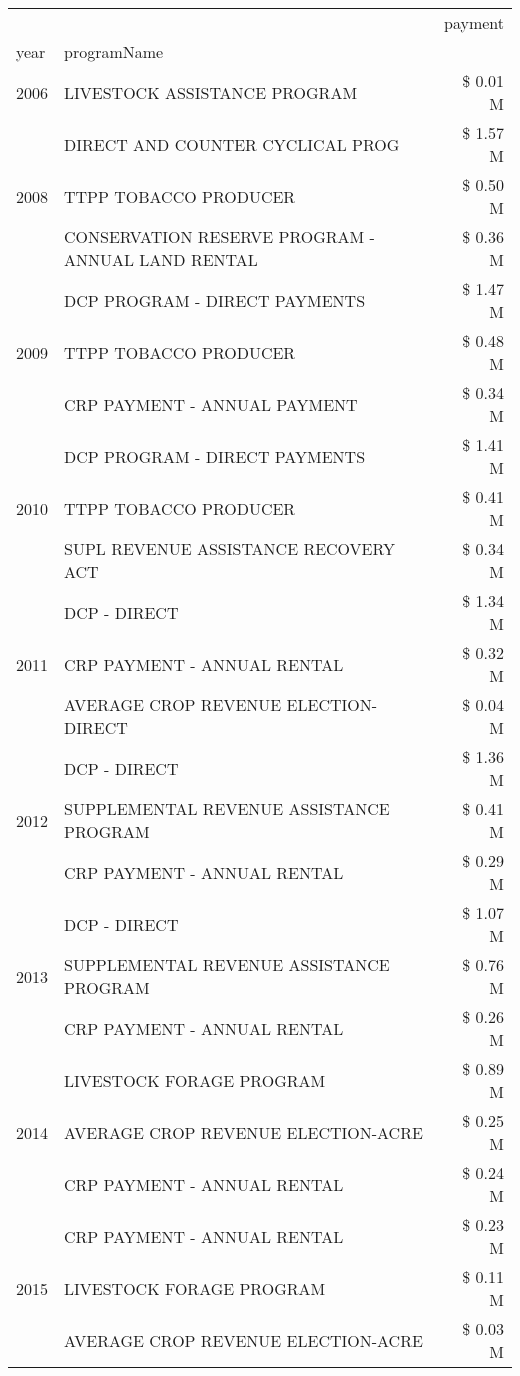 \begin{tabular}{llr}
\toprule
 &  & payment \\
year & programName &  \\
\midrule
2006 & LIVESTOCK ASSISTANCE PROGRAM & \$ 0.01 M \\
\cline{1-3}
\multirow[t]{3}{*}{2008} & DIRECT AND COUNTER CYCLICAL PROG & \$ 1.57 M \\
 & TTPP TOBACCO PRODUCER & \$ 0.50 M \\
 & CONSERVATION RESERVE PROGRAM - ANNUAL LAND RENTAL & \$ 0.36 M \\
\cline{1-3}
\multirow[t]{3}{*}{2009} & DCP PROGRAM - DIRECT PAYMENTS & \$ 1.47 M \\
 & TTPP TOBACCO PRODUCER & \$ 0.48 M \\
 & CRP PAYMENT - ANNUAL PAYMENT & \$ 0.34 M \\
\cline{1-3}
\multirow[t]{3}{*}{2010} & DCP PROGRAM - DIRECT PAYMENTS & \$ 1.41 M \\
 & TTPP TOBACCO PRODUCER & \$ 0.41 M \\
 & SUPL REVENUE ASSISTANCE RECOVERY ACT & \$ 0.34 M \\
\cline{1-3}
\multirow[t]{3}{*}{2011} & DCP - DIRECT & \$ 1.34 M \\
 & CRP PAYMENT - ANNUAL RENTAL & \$ 0.32 M \\
 & AVERAGE CROP REVENUE ELECTION-DIRECT & \$ 0.04 M \\
\cline{1-3}
\multirow[t]{3}{*}{2012} & DCP - DIRECT & \$ 1.36 M \\
 & SUPPLEMENTAL REVENUE ASSISTANCE PROGRAM & \$ 0.41 M \\
 & CRP PAYMENT - ANNUAL RENTAL & \$ 0.29 M \\
\cline{1-3}
\multirow[t]{3}{*}{2013} & DCP - DIRECT & \$ 1.07 M \\
 & SUPPLEMENTAL REVENUE ASSISTANCE PROGRAM & \$ 0.76 M \\
 & CRP PAYMENT - ANNUAL RENTAL & \$ 0.26 M \\
\cline{1-3}
\multirow[t]{3}{*}{2014} & LIVESTOCK FORAGE PROGRAM & \$ 0.89 M \\
 & AVERAGE CROP REVENUE ELECTION-ACRE & \$ 0.25 M \\
 & CRP PAYMENT - ANNUAL RENTAL & \$ 0.24 M \\
\cline{1-3}
\multirow[t]{3}{*}{2015} & CRP PAYMENT - ANNUAL RENTAL & \$ 0.23 M \\
 & LIVESTOCK FORAGE PROGRAM & \$ 0.11 M \\
 & AVERAGE CROP REVENUE ELECTION-ACRE & \$ 0.03 M \\

\end{tabular}
